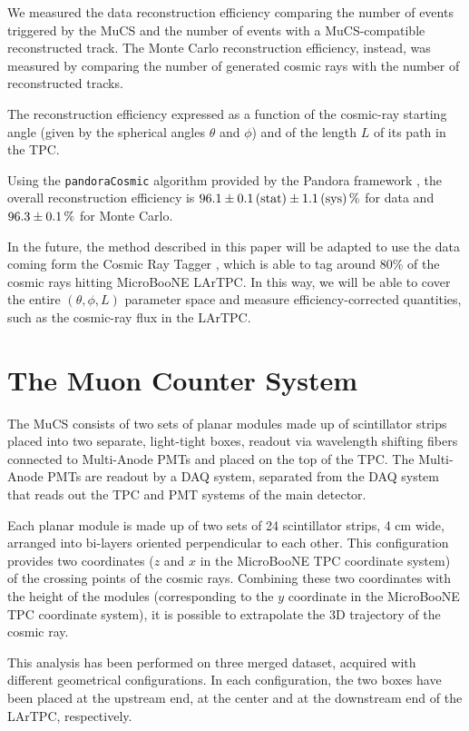 \documentclass[a4paper]{scrartcl}
\begin{document}
We measured the data reconstruction efficiency comparing the number of events triggered by the MuCS and the number of events with a MuCS-compatible reconstructed track. 
The Monte Carlo reconstruction efficiency, instead, was measured by comparing the number of generated cosmic rays with the number of reconstructed tracks. 

The reconstruction efficiency expressed as a function of the cosmic-ray starting angle (given by the spherical angles $\theta$ and $\phi$) and of the length $L$ of its path in the TPC.

Using the \texttt{pan\-do\-ra\-Co\-smic} algorithm \cite{pandoracosmic} provided by the Pandora framework \cite{pandora}, the overall reconstruction efficiency is $96.1\pm0.1\thinspace(\mathrm{stat}) \pm 1.1\thinspace(\mathrm{sys})\thinspace\%$ for data and $96.3\pm0.1\thinspace\%$ for Monte Carlo.

In the future, the method described in this paper will be adapted to use the data coming form the Cosmic Ray Tagger \cite{crt}, which is able to tag around 80\% of the cosmic rays hitting MicroBooNE LArTPC. In this way, we will be able to cover the entire $(\theta,\phi,L)$ parameter space and measure efficiency-corrected quantities, such as the cosmic-ray flux in the LArTPC.

\section{The Muon Counter System}\label{sec:proc}
The MuCS consists of two sets of planar modules made up of scintillator strips placed into two separate, light-tight boxes, readout via wavelength shifting fibers connected to Multi-Anode PMTs and placed on the top of the TPC. The Multi-Anode PMTs are readout by a DAQ system, separated from the DAQ system that reads out the TPC and PMT systems of the main detector. 

Each planar module is made up of two sets of 24 scintillator strips, 4 cm wide, arranged into bi-layers oriented perpendicular to each other. This configuration provides two coordinates ($z$ and $x$ in the MicroBooNE TPC coordinate system) of the crossing points of the cosmic rays. Combining these two coordinates with the height of the modules (corresponding to the $y$ coordinate in the MicroBooNE TPC coordinate system), it is possible to extrapolate the 3D trajectory of the cosmic ray. 

This analysis has been performed on three merged dataset, acquired with different geometrical configurations. In each configuration, the two boxes have been placed at the upstream end, at the center and at the downstream end of the LArTPC, respectively. 
\end{document}
